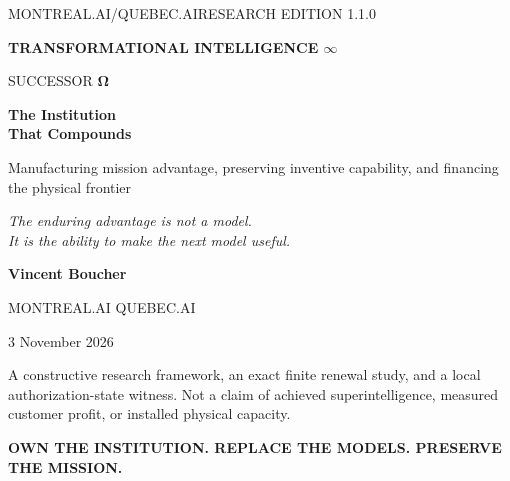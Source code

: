 \documentclass[11pt,a4paper]{article}
\begin{document}
\hypersetup{pageanchor=false}
\begin{titlepage}
\color{ink}
\vspace*{3mm}
{\sffamily\small\color{gold} MONTREAL.AI\quad /\quad QUEBEC.AI\hfill RESEARCH EDITION 1.1.0}\par
\vspace{17mm}
{\sffamily\small\bfseries\color{wine} TRANSFORMATIONAL INTELLIGENCE $\boldsymbol{\infty}$}\par
\vspace{5mm}
{\fontsize{43}{47}\selectfont SUCCESSOR $\boldsymbol{\Omega}$}\par
\vspace{5mm}
{\fontsize{29}{35}\selectfont\bfseries The Institution\\That Compounds\par}
\vspace{8mm}
{\large Manufacturing mission advantage, preserving inventive capability, and financing the physical frontier}\par
\vspace{10mm}
\par
\vspace{6mm}
{\large\itshape The enduring advantage is not a model.\\[2pt]It is the ability to make the next model useful.\par}
\vfill
{\large\bfseries Vincent Boucher}\par
{\sffamily MONTREAL.AI \;\textbullet\; QUEBEC.AI}\par
{3 November 2026}\par
\vspace{8mm}
{\small\color{muted} A constructive research framework, an exact finite renewal study, and a local authorization-state witness. Not a claim of achieved superintelligence, measured customer profit, or installed physical capacity.}\par
\vspace{5mm}
{\sffamily\bfseries\color{gold} OWN THE INSTITUTION. REPLACE THE MODELS. PRESERVE THE MISSION.}
\end{titlepage}
\end{document}
